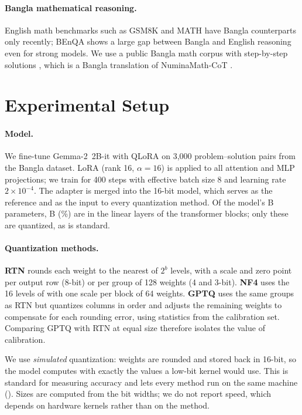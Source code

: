 \documentclass[11pt]{article}
\begin{document}
\paragraph{Bangla mathematical reasoning.}
English math benchmarks such as GSM8K \citep{cobbe2021gsm8k} and MATH \citep{hendrycks2021math} have Bangla counterparts only recently; BEnQA \citep{shafayat2024benqa} shows a large gap between Bangla and English reasoning even for strong models. We use a public Bangla math corpus with step-by-step solutions \citep{ashrafur2024banglamath}, which is a Bangla translation of NuminaMath-CoT \citep{numinamath2024}.

\section{Experimental Setup}

\paragraph{Model.}
We fine-tune Gemma-2~2B-it \citep{gemma2024gemma2} with QLoRA \citep{dettmers2023qlora,hu2022lora} on 3,000 problem--solution pairs from the Bangla dataset. LoRA (rank 16, $\alpha=16$) is applied to all attention and MLP projections; we train for 400 steps with effective batch size 8 and learning rate $2\times10^{-4}$. The adapter is merged into the 16-bit model, which serves as the reference and as the input to every quantization method. Of the model's \ParamsTotal{}B parameters, \ParamsQuant{}B (\ParamsQuantShare\%) are in the linear layers of the transformer blocks; only these are quantized, as is standard.

\paragraph{Quantization methods.}
\textbf{RTN} rounds each weight to the nearest of $2^b$ levels, with a scale and zero point per output row (8-bit) or per group of 128 weights (4 and 3-bit). \textbf{NF4} uses the 16 levels of \citet{dettmers2023qlora} with one scale per block of 64 weights. \textbf{GPTQ} \citep{frantar2023gptq} uses the same groups as RTN but quantizes columns in order and adjusts the remaining weights to compensate for each rounding error, using statistics from the calibration set. Comparing GPTQ with RTN at equal size therefore isolates the value of calibration.

We use \emph{simulated} quantization: weights are rounded and stored back in 16-bit, so the model computes with exactly the values a low-bit kernel would use. This is standard for measuring accuracy and lets every method run on the same machine (\EvalDevice). Sizes are computed from the bit widths; we do not report speed, which depends on hardware kernels rather than on the method.
\end{document}

